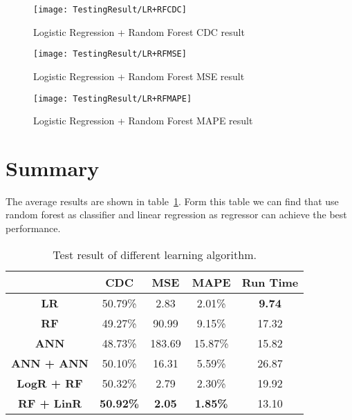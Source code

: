\begin{figure}[h]
	\centering
	\texttt{[image: TestingResult/LR+RFCDC]}
	\caption{Logistic Regression + Random Forest CDC result}
	\label{fg:lrRfCdc}
\end{figure}

\begin{figure}[h]
	\centering
	\texttt{[image: TestingResult/LR+RFMSE]}
	\caption{Logistic Regression + Random Forest MSE result}
	\label{fg:lrRfMse}
\end{figure}

\begin{figure}[h]
	\centering
	\texttt{[image: TestingResult/LR+RFMAPE]}
	\caption{Logistic Regression + Random Forest MAPE result}
	\label{fg:lrRfMape}
\end{figure}

\clearpage

\section{Summary}

The average results are shown in table~\ref{tb:averageResult}. Form this table we can find that use random forest as classifier and linear regression as regressor can achieve the best performance.

\begin{table}[h]
	\centering
	\begin{tabular}{|c|c|c|c|c|}
		\hline
		& \textbf{CDC}     & \textbf{MSE}  & \textbf{MAPE}   & \textbf{Run Time} \\ \hline
		\textbf{LR}        & 50.79\%          & 2.83          & 2.01\%          & \textbf{9.74}     \\ \hline
		\textbf{RF}        & 49.27\%          & 90.99         & 9.15\%          & 17.32             \\ \hline
		\textbf{ANN}       & 48.73\%          & 183.69        & 15.87\%         & 15.82             \\ \hline
		\textbf{ANN + ANN} & 50.10\%          & 16.31         & 5.59\%          & 26.87             \\ \hline
		\textbf{LogR + RF} & 50.32\%          & 2.79          & 2.30\%          & 19.92             \\ \hline
		\textbf{RF + LinR} & \textbf{50.92\%} & \textbf{2.05} & \textbf{1.85\%} & 13.10             \\ \hline
	\end{tabular}
	\caption{Test result of different learning algorithm.}
	\label{tb:averageResult}
\end{table}